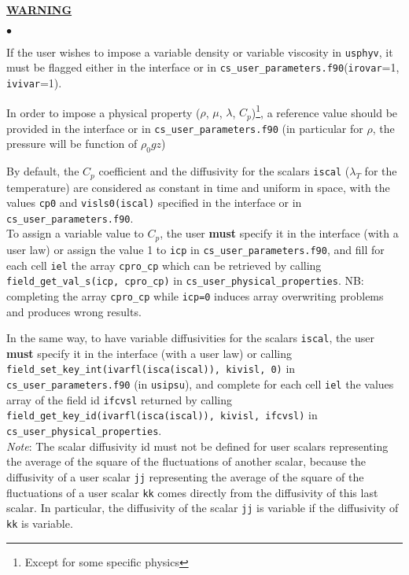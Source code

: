 {{{{\bf \underline{WARNING}}\label{sec:prg_propvar}%
\begin{list}{$\bullet$}{}
\item If the user wishes to impose a variable density or variable viscosity in
      \texttt{usphyv}, it must be flagged either in the interface or in
      \texttt{cs\_user\_parameters.f90}(\texttt{irovar}=1, \texttt{ivivar}=1).
\item In order to impose a physical property ($\rho$, $\mu$,
      $\lambda$, $C_p$)\footnote{Except for some specific physics}, a reference
      value should be provided in the interface or in \texttt{cs\_user\_parameters.f90} (in
      particular for $\rho$, the pressure will be function of $\rho_0 gz$)
\item By default, the $C_p$ coefficient and the
      diffusivity for the scalars \texttt{iscal} ($\lambda_T$ for the
      temperature) are considered as constant in time and uniform in
      space, with the values \texttt{cp0} and \texttt{visls0(iscal)}
      specified in the interface or in \texttt{cs\_user\_parameters.f90}.\\
To assign a variable value to $C_p$, the user \textbf{must} specify it in the
      interface (with a user law) or assign the value 1 to \texttt{icp} in \texttt{cs\_user\_parameters.f90},
      and fill for each cell \texttt{iel} the array \texttt{cpro\_cp} which can be retrieved by calling
      \texttt{field\_get\_val\_s(icp, cpro\_cp)} in \texttt{cs\_user\_physical\_properties}.
      NB: completing the array \texttt{cpro\_cp} while \texttt{icp=0} induces array
      overwriting problems and produces wrong results.

\item In the same way, to have variable diffusivities for the scalars
      \texttt{iscal}, the user \textbf{must} specify it in the interface (with a user law) or calling \texttt{field\_set\_key\_int(ivarfl(isca(iscal)), kivisl, 0)}
      in \texttt{cs\_user\_parameters.f90} (in \texttt{usipsu}), and complete for each cell
      \texttt{iel} the values array of the field id \texttt{ifcvsl} returned by calling
      \texttt{field\_get\_key\_id(ivarfl(isca(iscal)), kivisl, ifcvsl)}
      in \texttt{cs\_user\_physical\_properties}.\\

{\em Note}: The scalar diffusivity id must not be defined for
      user scalars representing the average of the square of the
      fluctuations of another scalar, because the diffusivity of a user
      scalar \texttt{jj} representing the average of the square of the
      fluctuations of a user scalar \texttt{kk} comes directly from the
      diffusivity of this last scalar. In particular, the diffusivity
      of the scalar \texttt{jj} is variable if the diffusivity of \texttt{kk}
      is variable.
\end{list}


}}}
